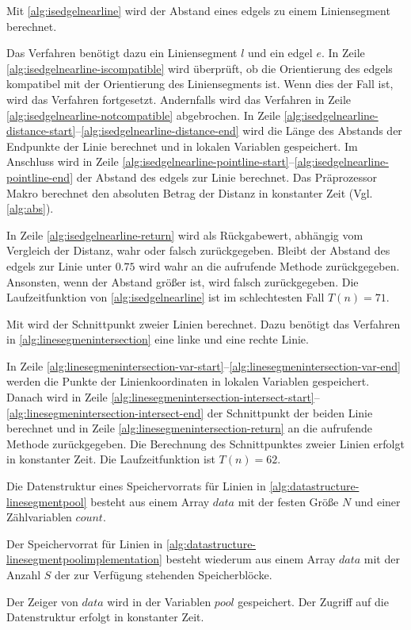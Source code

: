Mit \autoref{alg:isedgelnearline} wird der Abstand eines \glspl{edgel} zu einem Liniensegment berechnet.

Das Verfahren benötigt dazu ein Liniensegment $l$ und ein \gls{edgel} $e$. In Zeile
 \ref{alg:isedgelnearline-iscompatible} wird überprüft, ob die Orientierung des \glspl{edgel} kompatibel mit der
 Orientierung des Liniensegments ist. Wenn dies der Fall ist, wird das Verfahren fortgesetzt. Andernfalls wird das
 Verfahren in Zeile \ref{alg:isedgelnearline-notcompatible} abgebrochen. In Zeile
 \ref{alg:isedgelnearline-distance-start}--\ref{alg:isedgelnearline-distance-end} wird die Länge des Abstands der
 Endpunkte der Linie berechnet und in lokalen Variablen gespeichert. Im Anschluss wird in Zeile
 \ref{alg:isedgelnearline-pointline-start}--\ref{alg:isedgelnearline-pointline-end} der Abstand des \glspl{edgel} zur
 Linie berechnet. Das Präprozessor Makro  berechnet den absoluten Betrag der Distanz in konstanter Zeit
 (Vgl. \autoref{alg:abs}).

In Zeile \ref{alg:isedgelnearline-return} wird als Rückgabewert, abhängig vom Vergleich der Distanz, wahr oder falsch
 zurückgegeben. Bleibt der Abstand des \glspl{edgel} zur Linie unter $0.75$ wird wahr an die aufrufende Methode
 zurückgegeben. Ansonsten, wenn der Abstand größer ist, wird falsch zurückgegeben. Die Laufzeitfunktion von
 \autoref{alg:isedgelnearline} ist im schlechtesten Fall $T(n) = 71$.

Mit  wird der Schnittpunkt zweier Linien berechnet. Dazu benötigt das Verfahren in
 \autoref{alg:linesegmenintersection} eine linke und eine rechte Linie.

 In Zeile \ref{alg:linesegmenintersection-var-start}--\ref{alg:linesegmenintersection-var-end} werden die Punkte der
 Linienkoordinaten in lokalen Variablen gespeichert. Danach wird in Zeile
 \ref{alg:linesegmenintersection-intersect-start}--\ref{alg:linesegmenintersection-intersect-end} der Schnittpunkt der
 beiden Linie berechnet und in Zeile \ref{alg:linesegmenintersection-return} an die aufrufende Methode zurückgegeben.
 Die Berechnung des Schnittpunktes zweier Linien erfolgt in konstanter Zeit. Die Laufzeitfunktion ist $T(n) = 62$.

Die Datenstruktur eines Speichervorrats für Linien in \autoref{alg:datastructure-linesegmentpool} besteht aus einem
 Array $\mathit{data}$ mit der festen Größe $N$ und einer Zählvariablen $\mathit{count}$.

Der Speichervorrat für Linien in \autoref{alg:datastructure-linesegmentpoolimplementation} besteht wiederum aus einem
 Array $\mathit{data}$ mit der Anzahl $S$ der zur Verfügung stehenden Speicherblöcke.

Der Zeiger von $\mathit{data}$ wird in der Variablen $\mathit{pool}$ gespeichert. Der Zugriff auf die Datenstruktur
 erfolgt in konstanter Zeit.

